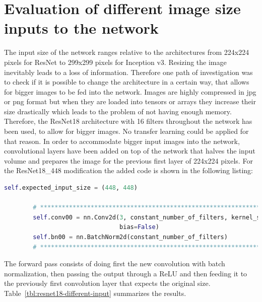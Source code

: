 \section{Evaluation of different image size inputs to the network}

The input size of the network ranges relative to the architectures from 224x224 pixels for ResNet to 299x299 pixels for Inception v3. Resizing the image inevitably leads to a loss of information. Therefore one path of investigation was to check if it is possible to change the architecture in a certain way, that allows for bigger images to be fed into the network. Images are highly compressed in jpg or png format but when they are loaded into tensors or arrays they increase their size drastically which leads to the problem of not having enough memory. Therefore, the ResNet18 architecture with 16 filters throughout the network has been used, to allow for bigger images. No transfer learning could be applied for that reason. In order to accommodate bigger input images into the network, convolutional layers have been added on top of the network that halves the input volume and prepares the image for the previous first layer of 224x224 pixels. For the ResNet18\_448 modification the added code is shown in the following listing:

\begin{minipage}{\linewidth}
\begin{lstlisting}[language=Python, caption=Python example, basicstyle=\tiny]
        self.expected_input_size = (448, 448)

        # ************************************************************************************************
        self.conv00 = nn.Conv2d(3, constant_number_of_filters, kernel_size=7, stride=2, padding=3,
                                bias=False)
        self.bn00 = nn.BatchNorm2d(constant_number_of_filters)
        # ************************************************************************************************
\end{lstlisting}
\end{minipage}

The forward pass consists of doing first the new convolution with batch normalization, then passing the output through a ReLU and then feeding it to the previously first convolution layer that expects the original size. Table~\ref{tbl:resnet18-different-input} summarizes the results.

